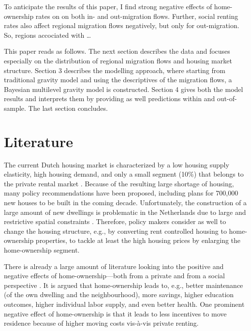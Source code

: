 \documentclass[11pt,parskip,abstracton,notitlepage, dvipsnames]{scrartcl}
\begin{document}
To anticipate the results of this paper, I find strong negative effects of
home-ownership rates on on both in- and out-migration flows. Further, social
renting rates also affect regional migration flows negatively, but only for
out-migration. So, regions accociated with \ldots

This paper reads as follows. The next section describes the data and focuses
especially on the distribution of regional migration flows and housing market
structure. Section 3 describes the modelling approach, where starting from
traditional gravity model and using the descriptives of the migration flows, a
Bayesian multilevel gravity model is constructed. Section 4 gives both the model
results and interprets them by providing as well predictions within and
out-of-sample. The last section concludes.

\section{Literature}

The current Dutch housing market is characterized by a low housing supply
elasticity, high housing demand, and only a small segment (10\%) that belongs to
the private rental market \citep{michielsen2017}. Because of the resulting large
shortage of housing, many policy recommendations have been proposed, including
plans for 700,000 new houses to be built in the coming decade. Unfortunately,
the construction of a large amount of new dwellings is problematic in the
Netherlands due to large and restrictive spatial constraints
\citep{michielsen2019}. Therefore, policy makers consider as well to change the
housing structure, e.g., by converting rent controlled housing to home-ownership
properties, to tackle at least the high housing prices by enlarging the
home-ownership segment.

There is already a large amount of literature looking into the positive and
negative effects of home-ownership---both from a private and from a social
perspective \citep[see for an overview][]{dietz2003social}. It is argued that
home-ownership leads to, e.g., better maintenance (of the own dwelling and the
neighbourhood), more savings, higher education outcomes, higher individual labor
supply, and even better health. One prominent negative effect of home-ownership
is that it leads to less incentives to move residence because of higher moving
costs vis-\`{a}-vis private renting.
\end{document}
